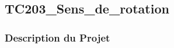 \documentclass[a4paper,12pt]{report}
\begin{document}
\newpage
\subsection{TC203\_Sens\_de\_rotation}
\begin{center}
\label{}
\end{center}
\subsubsection{Description du Projet}
\end{document}
